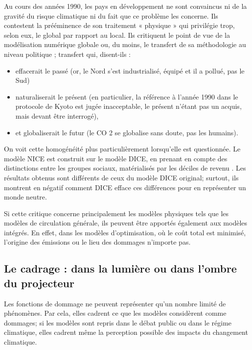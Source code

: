 \begin{displayquote}
    Au cours des années 1990, les pays en développement ne sont convaincus ni de la gravité du risque climatique ni du fait que ce problème les concerne. Ils contestent la prééminence de son traitement « physique » qui privilégie trop, selon eux, le global par rapport au local. Ils critiquent le point de vue de la modélisation numérique globale ou, du moins, le transfert de sa méthodologie au niveau politique ; transfert qui, disent-ils :  
    \begin{itemize}
        \item effacerait le passé (or, le Nord s’est industrialisé, équipé et il a pollué, pas le Sud)
	    \item naturaliserait le présent (en particulier, la référence à l’année 1990 dans le protocole de Kyoto est jugée inacceptable, le présent n’étant pas un acquis, mais devant être interrogé),
	   \item et globaliserait le futur (le CO 2 se globalise sans doute, pas les humains).
    \end{itemize}
\end{displayquote}
On voit cette homogénéité plus particulièrement lorsqu'elle est questionnée. Le modèle NICE est construit sur le modèle DICE, en prenant en compte des distinctions entre les groupes sociaux, matérialisés par les déciles de revenu \cite{dennig_inequality_2015}. Les résultats obtenus sont différents de ceux du modèle DICE original; surtout, ils montrent en négatif comment DICE efface ces différences pour en représenter un monde neutre. 

Si cette critique concerne principalement les modèles physiques tels que les modèles de circulation générale, ils peuvent être apportés également aux modèles intégrés. En effet, dans les modèles d'optimisation, où le coût total est minimisé, l'origine des émissions ou le lieu des dommages n'importe pas.  


\subsection{Le cadrage : dans la lumière ou dans l'ombre du projecteur}

Les fonctions de dommage ne peuvent représenter qu'un nombre limité de phénomènes. Par cela, elles cadrent ce que les modèles considèrent comme dommages; si les modèles sont repris dans le débat public ou dans le régime climatique, elles cadrent même la perception possible des impacts du changement climatique. \\

